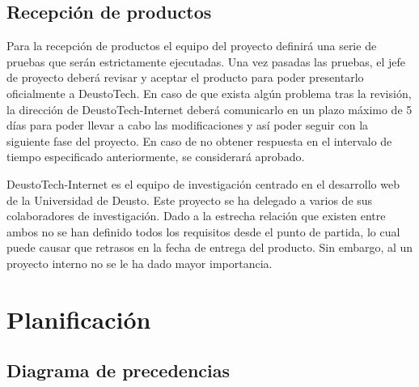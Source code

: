 \section{Recepción de productos}

Para la recepción de productos el equipo del proyecto definirá una serie de pruebas que serán estrictamente ejecutadas. Una vez pasadas las pruebas, el jefe de proyecto deberá revisar y aceptar el producto para poder presentarlo oficialmente a DeustoTech.  En caso de que exista algún problema tras la revisión,  la dirección de DeustoTech-Internet deberá comunicarlo en un plazo máximo de 5 días para poder llevar a cabo las modificaciones y así poder seguir con la siguiente fase del proyecto. En caso de no obtener respuesta en el intervalo de tiempo especificado anteriormente, se considerará aprobado.

DeustoTech-Internet es el equipo de investigación centrado en el desarrollo web de la Universidad de Deusto. Este proyecto se ha delegado a varios de sus colaboradores de investigación. Dado a la estrecha relación que existen entre ambos no se han definido todos los requisitos desde el punto de partida, lo cual puede causar que retrasos en la fecha de entrega del producto. Sin embargo, al un proyecto interno no se le ha dado mayor importancia.

\chapter{Planificación}

\section{Diagrama de precedencias}

